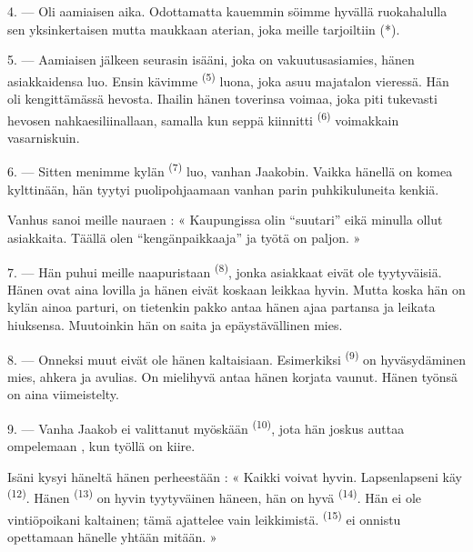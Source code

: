 4. --- Oli aamiaisen aika. Odottamatta kauemmin söimme hyvällä ruokahalulla sen
yksinkertaisen mutta maukkaan aterian, joka meille tarjoiltiin (*).

\VUsaut{3.0mm}

5. --- Aamiaisen jälkeen seurasin isääni, joka on vakuutusasiamies, hänen
asiakkaidensa luo. Ensin kävimme  \textsuperscript{(5)} luona,
joka asuu majatalon vieressä. Hän oli kengittämässä hevosta. Ihailin hänen
toverinsa voimaa, joka piti tukevasti hevosen 
nahkaesiliinallaan, samalla kun seppä kiinnitti 
\textsuperscript{(6)} voimakkain vasarniskuin.

6. --- Sitten menimme kylän  \textsuperscript{(7)} luo, vanhan
Jaakobin. Vaikka hänellä on komea  kylttinään, hän tyytyi
puolipohjaamaan vanhan parin puhkikuluneita kenkiä.

Vanhus sanoi meille nauraen : « Kaupungissa olin “suutari” eikä minulla ollut
asiakkaita. Täällä olen “kengänpaikkaaja” ja työtä on paljon. »

7. --- Hän puhui meille naapuristaan  \textsuperscript{(8)},
jonka asiakkaat eivät ole tyytyväisiä. Hänen  ovat aina
lovilla ja hänen  eivät koskaan leikkaa hyvin. Mutta koska hän
on kylän ainoa parturi, on tietenkin pakko antaa hänen ajaa partansa ja
leikata hiuksensa. Muutoinkin hän on saita ja epäystävällinen mies.

8. --- Onneksi muut  eivät ole hänen kaltaisiaan. Esimerkiksi
 \textsuperscript{(9)} on hyväsydäminen mies, ahkera ja
avulias. On mielihyvä antaa hänen korjata vaunut. Hänen työnsä on aina
viimeistelty.

9. --- Vanha Jaakob ei valittanut myöskään 
\textsuperscript{(10)}, jota hän joskus auttaa ompelemaan ,
kun työllä on kiire.

Isäni kysyi häneltä hänen perheestään : « Kaikki voivat hyvin. Lapsenlapseni käy
 \textsuperscript{(12)}. Hänen 
\textsuperscript{(13)} on hyvin tyytyväinen häneen, hän on hyvä 
\textsuperscript{(14)}. Hän ei ole vintiöpoikani kaltainen; tämä ajattelee vain
leikkimistä.  \textsuperscript{(15)} ei onnistu opettamaan
hänelle yhtään mitään. »

